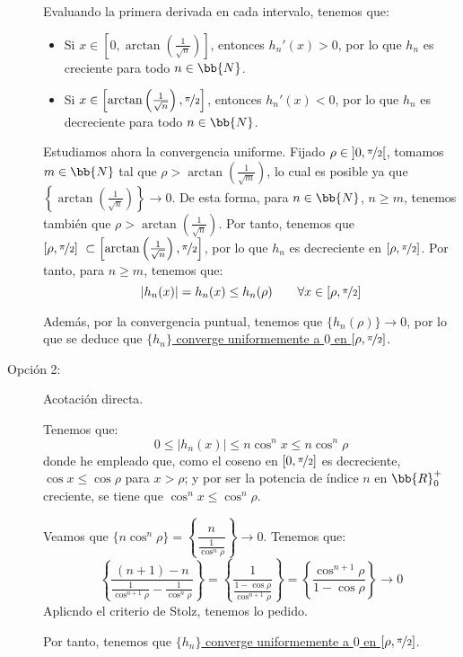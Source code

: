 \begin{ejercicio}
\begin{description}
        Evaluando la primera derivada en cada intervalo, tenemos que:
        \begin{itemize}
            \item Si $x\in \left[0,\arctan\left(\frac{1}{\sqrt{n}}\right)\right]$, entonces $h_n'(x) > 0$, por lo que $h_n$ es creciente para todo $n\in \bb{N}$.
            \item Si $x\in \left[\arctan\left(\frac{1}{\sqrt{n}}\right),\nicefrac{\pi}{2}\right]$, entonces $h_n'(x) < 0$, por lo que $h_n$ es decreciente para todo $n\in \bb{N}$.
        \end{itemize}

        Estudiamos ahora la convergencia uniforme. Fijado $\rho \in \left]0,\nicefrac{\pi}{2}\right[$,
        tomamos $m\in \bb{N}$ tal que $\rho > \arctan\left(\frac{1}{\sqrt{m}}\right)$, lo cual es posible ya que
        $\left\{\arctan\left(\frac{1}{\sqrt{n}}\right)\right\}\to 0$. De esta forma,
        para $n\in \bb{N}$, $n\geq m$, tenemos también que $\rho > \arctan\left(\frac{1}{\sqrt{n}}\right)$. Por tanto,
        tenemos que $[\rho ,\nicefrac{\pi}{2}]~\subset \left[\arctan\left(\frac{1}{\sqrt{n}}\right),\nicefrac{\pi}{2}\right]$,
        por lo que $h_n$ es decreciente en $[\rho,\nicefrac{\pi}{2}]$. Por tanto, para $n\geq m$, tenemos que:
        \begin{equation*}
            |h_n(x)| = h_n(x) \leq h_n(\rho) \qquad \forall x\in [\rho,\nicefrac{\pi}{2}]
        \end{equation*}

        Además, por la convergencia puntual, tenemos que $\{h_n(\rho)\}\to 0$, por lo que se deduce que \ul{$\{h_n\}$ converge uniformemente a $0$ en $[\rho,\nicefrac{\pi}{2}]$}.

        \item [Opción 2:] Acotación directa.
        
        Tenemos que:
        \begin{equation*}
            0 \leq |h_n(x)| \leq n\cos^n x \leq n\cos^n \rho
        \end{equation*}
        donde he empleado que, como el coseno en $[0,\nicefrac{\pi}{2}]$ es decreciente,
        $\cos x \leq \cos\rho$ para $x>\rho$; y por ser la potencia de índice $n$ en $\bb{R}^+_0$ creciente, se tiene que $\cos^n x \leq \cos^n \rho$.

        Veamos que $\{n\cos^n \rho\}=\left\{\dfrac{n}{\frac{1}{\cos^n \rho}}\right\}\to 0$. Tenemos que:
        \begin{equation*}
            \left\{\frac{(n+1)-n}{\frac{1}{\cos^{n+1} \rho}-\frac{1}{\cos^{n} \rho}}\right\}
            = \left\{\frac{1}{\frac{1-\cos \rho}{\cos^{n+1} \rho}}\right\}
            = \left\{\frac{\cos^{n+1} \rho}{1-\cos \rho}\right\} \to 0
        \end{equation*}
        Aplicndo el criterio de Stolz, tenemos lo pedido.

        Por tanto, tenemos que \ul{$\{h_n\}$ converge uniformemente a $0$ en $[\rho,\nicefrac{\pi}{2}]$}.
    \end{description}
\end{ejercicio}



